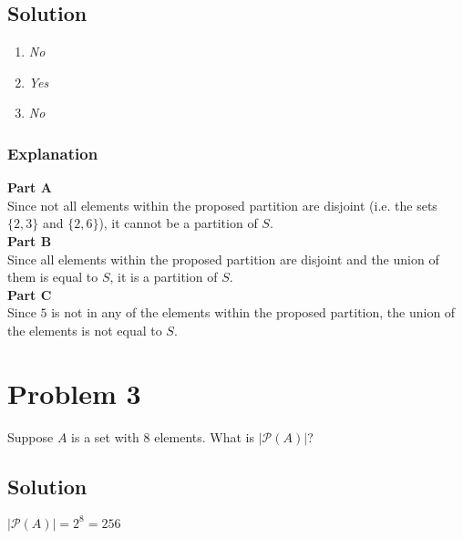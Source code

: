 \documentclass[table]{article}
\begin{document}
\subsection{Solution}
\begin{enumerate}[nosep, label=\alph*)]
\item \textit{No}
\item \textit{Yes}
\item \textit{No}
\end{enumerate}
\subsubsection{Explanation}
\textbf{Part A}\\
Since not all elements within the proposed partition are disjoint (i.e. the sets $\{2, 3\}$ and $\{2, 6\}$), it cannot be a partition of $S$.\\
\textbf{Part B}\\
Since all elements within the proposed partition are disjoint and the union of them is equal to $S$, it is a partition of $S$.\\
\textbf{Part C}\\
Since $5$ is not in any of the elements within the proposed partition, the union of the elements is not equal to $S$.
\section{Problem 3}
Suppose $A$ is a set with 8 elements. What is $|\mathcal{P}(A)|$?
\subsection{Solution}
$|\mathcal{P}(A)|=2^8=256$
\end{document}
